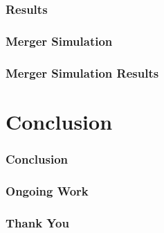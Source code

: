 \documentclass[xcolor=dvipsnames]{beamer}
\begin{document}
	\begin{frame}
		\frametitle{Results}
	\end{frame}
	
	\begin{frame}
		\frametitle{Merger Simulation}
	\end{frame}
	
	\begin{frame}
		\frametitle{Merger Simulation Results}
		
	\end{frame}
	
	\section{Conclusion}
	\begin{frame}
		\frametitle{Conclusion}

	\end{frame}

	\begin{frame}
		\frametitle{Ongoing Work}
	\end{frame}
	
	\begin{frame}
		\frametitle{Thank You}
	\end{frame}

	
	
	
\end{document}
